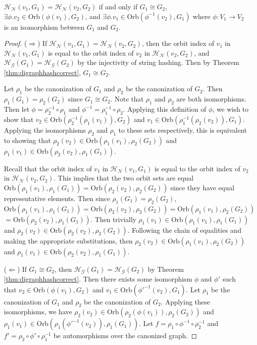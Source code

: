 \documentclass{svproc}
\begin{document}
\begin{theorem}
\label{thm:digraphnodehashcorrect}
$\mathcal{H_N}(v_1, G_1)=\mathcal{H_N}(v_2, G_2)$ if and only if $G_1 \cong G_2$, $\exists \phi . v_2 \in \text{Orb}(\phi(v_1), G_2)$, and $\exists \phi . v_1 \in \text{Orb}(\phi^{-1}(v_2), G_1)$ where $\phi : V_1 \rightarrow V_2$ is an isomorphism between $G_1$ and $G_2$.
\end{theorem}

\begin{proof}
($\Rightarrow$) If $\mathcal{H_N}(v_1, G_1)=\mathcal{H_N}(v_2, G_2)$, then the orbit index of $v_1$ in $\mathcal{H_N}(v_1, G_1)$ is equal to the orbit index of $v_2$ in $\mathcal{H_N}(v_2, G_2)$, and $\mathcal{H_G}(G_1)=\mathcal{H_G}(G_2)$ by the injectivity of string hashing. Then by Theorem \ref{thm:digraphhashcorrect}, $G_1 \cong G_2$.

Let $\rho_1$ be the canonization of $G_1$ and $\rho_2$ be the canonization of $G_2$. Then $\rho_1(G_1)=\rho_2(G_2)$ since $G_1 \cong G_2$. Note that $\rho_1$ and $\rho_2$ are both isomorphisms. Then let $\phi=\rho_2^{-1} \circ \rho_1$ and $\phi^{-1}=\rho_1^{-1} \circ \rho_2$. Applying this definition of $\phi$, we wish to show that $v_2 \in \text{Orb}(\rho_2^{-1}(\rho_1 (v_1)), G_2)$ and $v_1 \in \text{Orb}(\rho_1^{-1}(\rho_2 (v_2)), G_1)$. Applying the isomorphisms $\rho_2$ and $\rho_1$ to these sets respectively, this is equivalent to showing that $\rho_2(v_2) \in \text{Orb}(\rho_1 (v_1), \rho_2(G_2))$ and $\rho_1(v_1) \in \text{Orb}(\rho_2 (v_2), \rho_1(G_1))$.

Recall that the orbit index of $v_1$ in $\mathcal{H_N}(v_1, G_1)$ is equal to the orbit index of $v_2$ in $\mathcal{H_N}(v_2, G_2)$. This implies that the two orbit sets are equal $\text{Orb}(\rho_1 (v_1), \rho_1(G_1))=\text{Orb}(\rho_2 (v_2), \rho_2(G_2))$ since they have equal representative elements. Then since $\rho_1(G_1)=\rho_2(G_2)$, $\text{Orb}(\rho_1 (v_1), \rho_1(G_1))=\text{Orb}(\rho_2 (v_2), \rho_2(G_2))=\text{Orb}(\rho_1 (v_1), \rho_2(G_2))$\\
$=\text{Orb}(\rho_2 (v_2), \rho_1(G_1))$. Then trivially $\rho_1(v_1) \in \text{Orb}(\rho_1 (v_1), \rho_1(G_1))$ and $\rho_2(v_2) \in \text{Orb}(\rho_2 (v_2), \rho_2(G_2))$. Following the chain of equalities and making the appropriate substitutions, then $\rho_2(v_2) \in \text{Orb}(\rho_1 (v_1), \rho_2(G_2))$ and $\rho_1(v_1) \in \text{Orb}(\rho_2 (v_2), \rho_1(G_1))$.

($\Leftarrow$) If $G_1 \cong G_2$, then $\mathcal{H_G}(G_1)=\mathcal{H_G}(G_2)$ by Theorem \ref{thm:digraphhashcorrect}. Then there exists some isomorphism $\phi$ and $\phi'$ such that $v_2 \in \text{Orb}(\phi(v_1),G_2)$ and $v_1 \in \text{Orb}(\phi'^{-1}(v_2),G_1)$. Let $\rho_1$ be the canonization of $G_1$ and $\rho_2$ be the canonization of $G_2$. Applying these isomorphisms, we have $\rho_2(v_2) \in \text{Orb}(\rho_2(\phi(v_1)), \rho_2(G_2))$ and $\rho_1(v_1) \in \text{Orb}(\rho_1(\phi'^{-1}(v_2)),\rho_1(G_1))$. Let $f=\rho_1 \circ \phi^{-1} \circ \rho_2^{-1}$ and $f'=\rho_2 \circ \phi' \circ \rho_1^{-1}$ be automorphisms over the canonized graph.


\end{proof}
\end{document}
